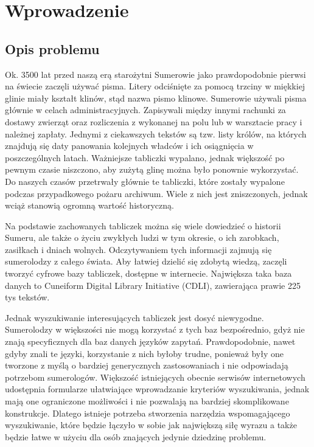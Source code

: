 \chapter*{Wprowadzenie}

 

\section*{Opis problemu}
Ok. 3500 lat przed naszą erą starożytni Sumerowie jako prawdopodobnie pierwsi na świecie zaczęli używać pisma. Litery odciśnięte za pomocą trzciny w miękkiej glinie miały kształt klinów, stąd nazwa pismo klinowe. Sumerowie używali pisma głównie w celach administracyjnych. Zapisywali między innymi rachunki za dostawy zwierząt oraz rozliczenia z wykonanej na polu lub w warsztacie pracy i należnej zapłaty. Jednymi z ciekawszych tekstów są tzw. listy królów, na których znajdują się daty panowania kolejnych władców i ich osiągnięcia w poszczególnych latach. 
Ważniejsze tabliczki wypalano, jednak większość po pewnym czasie niszczono, aby zużytą glinę można było ponownie wykorzystać. Do naszych czasów przetrwały głównie te tabliczki, które zostały wypalone podczas przypadkowego pożaru archiwum. Wiele z nich jest zniszczonych, jednak wciąż stanowią ogromną wartość historyczną. 
 
Na podstawie zachowanych tabliczek można się wiele dowiedzieć o historii Sumeru, ale także o życiu zwykłych ludzi w tym okresie, o ich zarobkach, zasiłkach i dniach wolnych. Odczytywaniem tych informacji zajmują się sumerolodzy z całego świata. Aby łatwiej dzielić się zdobytą wiedzą, zaczęli tworzyć cyfrowe bazy tabliczek, dostępne w internecie. Największa taka baza danych to Cuneiform Digital Library Initiative (CDLI), zawierająca prawie 225 tys tekstów.

Jednak wyszukiwanie interesujących tabliczek jest dosyć niewygodne. 
Sumerolodzy w większości nie mogą korzystać z tych baz bezpośrednio, gdyż nie znają specyficznych dla baz danych języków zapytań. Prawdopodobnie, nawet gdyby znali te języki, korzystanie z nich byłoby trudne, ponieważ były one tworzone z myślą o bardziej generycznych zastosowaniach i nie odpowiadają potrzebom sumerologów. 
Większość istniejących obecnie serwisów internetowych udostępnia formularze ułatwiające wprowadzanie kryteriów wyszukiwania, jednak mają one ograniczone możliwości i nie pozwalają na bardziej skomplikowane konstrukcje. Dlatego istnieje potrzeba stworzenia narzędzia wspomagającego wyszukiwanie, które będzie łączyło w sobie jak największą siłę wyrazu a także będzie łatwe w użyciu dla osób znających jedynie dziedzinę problemu.

